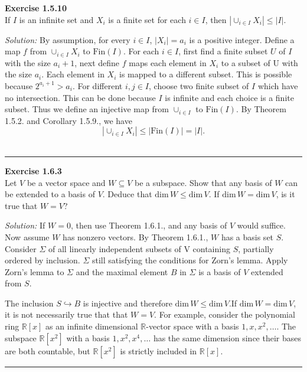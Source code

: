 \documentclass[a4paper, 11pt]{article}
\newenvironment{problem}[2][Exercise]
    { \begin{mdframed}[backgroundcolor=gray!20] \textbf{#1 #2} \\}
    {  \end{mdframed}}
\newenvironment{solution}
    {\textit{Solution:}}
    {}
\begin{document}
\begin{problem}{1.5.10}
If \(I\) is an infinite set and \(X_i\) is a finite set for each \(i\in I\), then \(|\cup_{i\in I}X_i|\leq |I|\).
\end{problem}
\begin{solution}
By assumption, for every \(i\in I\), \(|X_i|=a_i\) is a positive integer. Define a map \(f\) from \(\cup_{i\in I}X_i\) to \(\text{Fin}(I)\). For each \(i\in I\), first find a finite subset \(U\) of \(I\) with the size \(a_i+1\), next define \(f\) maps each element in \(X_i\) to a subset of U with the size \(a_i\).  Each element in \(X_i\) is mapped to a different subset. This is possible because \(2^{a_i+1}>a_i\). For different \(i,j\in I\), choose two finite subset of \(I\) which have no intersection. This can be done because \(I\) is infinite and each choice is a finite subset. Thus we define an injective map from \(\cup_{i\in I}\) to \(\text{Fin}(I)\). By Theorem 1.5.2. and Corollary 1.5.9., we have 
$$|\cup_{i\in I}X_i|\leq |\text{Fin}(I)|=|I|.$$
\\
\end{solution}
\noindent\rule{7in}{2.8pt}


\begin{problem}{1.6.3}
Let \(V\) be a vector space and \(W\subseteq V\) be a subspace. Show that any basis of \(W\) can be extended to a basis of \(V\). Deduce that \(\text{dim}\, W\leq \text{dim}\, V\). If \(\text{dim}\, W=\text{dim}\, V\), is it true that \(W=V\)?
\end{problem}
\begin{solution}
If \(W=0\), then use Theorem 1.6.1., and any basis of \(V\) would suffice. Now assume \(W\) has nonzero vectors. By Theorem 1.6.1., \(W\) has a basis set \(S\). Consider \(\Sigma\) of all linearly independent subsets of V containing \(S\), partially ordered by inclusion. \(\Sigma\) still satisfying the conditions for Zorn's lemma. Apply Zorn's lemma to \(\Sigma\) and the maximal element \(B\) in \(\Sigma\) is a basis of \(V\) extended from \(S\).
\par 
The inclusion \(S\hookrightarrow B\) is injective and therefore \(\text{dim}\, W \leq \text{dim}\, V\).If \(\text{dim}\, W=\text{dim}\, V\), it is not necessarily true that that \(W=V\). For example, consider the polynomial ring \(\mathbb{R}[x]\) as an infinite dimensional \(\mathbb{R}\)-vector space with a basis \(1,x,x^2,\ldots\). The subspace \(\mathbb{R}[x^2]\) with a basis \(1,x^2,x^4,\ldots\) has the same dimension since their bases are both countable, but \(\mathbb{R}[x^2]\) is strictly included in \(\mathbb{R}[x]\).

\end{solution}
\noindent\rule{7in}{2.8pt}
\end{document}
